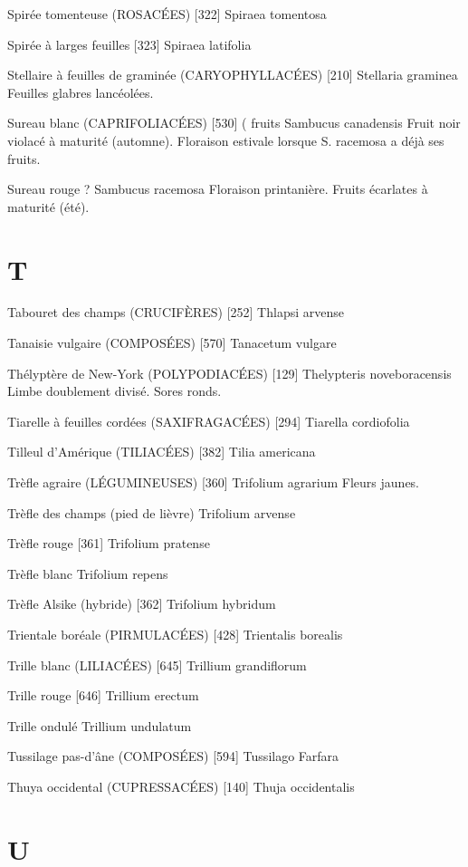 Spirée tomenteuse (ROSACÉES)  [322]
				Spiraea tomentosa

Spirée à larges feuilles  [323]
				Spiraea latifolia

Stellaire à feuilles de graminée (CARYOPHYLLACÉES)  [210]
				Stellaria graminea
Feuilles glabres lancéolées.

Sureau blanc (CAPRIFOLIACÉES)  [530]			( fruits
				Sambucus canadensis
Fruit noir violacé à maturité (automne). Floraison estivale lorsque S. racemosa a déjà ses fruits.

Sureau rouge								?
				Sambucus racemosa
Floraison printanière. Fruits écarlates à maturité (été).

\chapter*{T}

Tabouret des champs (CRUCIFÈRES)  [252]
				Thlapsi arvense

Tanaisie vulgaire (COMPOSÉES)  [570]
				Tanacetum vulgare

Thélyptère de New-York (POLYPODIACÉES) [129]
				Thelypteris noveboracensis
Limbe doublement divisé. Sores ronds.

Tiarelle à feuilles cordées (SAXIFRAGACÉES)  [294]
				Tiarella cordiofolia

Tilleul d’Amérique (TILIACÉES)  [382]
				Tilia americana

Trèfle agraire (LÉGUMINEUSES)  [360]
				Trifolium agrarium
Fleurs jaunes.

Trèfle des champs (pied de lièvre)
				Trifolium arvense

Trèfle rouge  [361]
				Trifolium pratense


Trèfle blanc
				Trifolium repens

Trèfle Alsike (hybride)  [362]
				Trifolium hybridum

Trientale boréale (PIRMULACÉES)  [428]
				Trientalis borealis

Trille blanc (LILIACÉES)  [645]
				Trillium grandiflorum

Trille rouge  [646]
				Trillium erectum

Trille ondulé
				Trillium undulatum

Tussilage pas-d’âne (COMPOSÉES)  [594]
				Tussilago Farfara

Thuya occidental (CUPRESSACÉES) [140]
				Thuja occidentalis

\chapter*{U}

